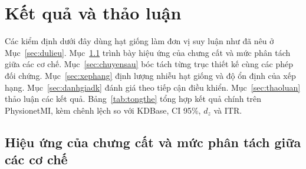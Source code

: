 \section{Kết quả và thảo luận}
\label{sec:ketqua}

Các kiểm định dưới đây dùng hạt giống làm đơn vị suy luận như đã nêu ở
Mục~\ref{sec:dulieu}. Mục~\ref{sec:hieuqua} trình bày hiệu ứng của chưng
cất và mức phân tách giữa các cơ chế. Mục~\ref{sec:chuyensau} bóc tách
từng trục thiết kế cùng các phép đối chứng. Mục~\ref{sec:xephang} định
lượng nhiễu hạt giống và độ ổn định của xếp hạng. Mục~\ref{sec:danhgiadk}
đánh giá theo tiếp cận điều khiển. Mục~\ref{sec:thaoluan} thảo luận các
kết quả. Bảng~\ref{tab:tongthe} tổng hợp kết quả chính trên PhysionetMI,
kèm chênh lệch so với KDBase, CI 95\%, $d_z$ và ITR.

\subsection{Hiệu ứng của chưng cất và mức phân tách giữa các cơ chế}
\label{sec:hieuqua}


